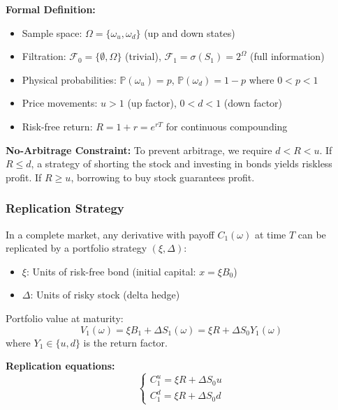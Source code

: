 \documentclass[10pt,twocolumn]{article}
\begin{document}
\textbf{Formal Definition:}
\begin{itemize}[leftmargin=*,itemsep=2pt]
    \item Sample space: $\Omega = \{\omega_u, \omega_d\}$ (up and down states)
    \item Filtration: $\mathcal{F}_0 = \{\emptyset, \Omega\}$ (trivial), $\mathcal{F}_1 = \sigma(S_1) = 2^\Omega$ (full information)
    \item Physical probabilities: $\mathbb{P}(\omega_u) = p$, $\mathbb{P}(\omega_d) = 1-p$ where $0 < p < 1$
    \item Price movements: $u > 1$ (up factor), $0 < d < 1$ (down factor)
    \item Risk-free return: $R = 1 + r = e^{rT}$ for continuous compounding
\end{itemize}

\begin{importantbox}
\textbf{No-Arbitrage Constraint:} To prevent arbitrage, we require $d < R < u$. If $R \leq d$, a strategy of shorting the stock and investing in bonds yields riskless profit. If $R \geq u$, borrowing to buy stock guarantees profit.
\end{importantbox}

\subsubsection{Replication Strategy}

In a complete market, any derivative with payoff $C_1(\omega)$ at time $T$ can be replicated by a portfolio strategy $(\xi, \Delta)$:

\begin{itemize}[itemsep=2pt]
    \item $\xi$: Units of risk-free bond (initial capital: $x = \xi B_0$)
    \item $\Delta$: Units of risky stock (delta hedge)
\end{itemize}

Portfolio value at maturity:
\begin{equation}
V_1(\omega) = \xi B_1 + \Delta S_1(\omega) = \xi R + \Delta S_0 Y_1(\omega)
\end{equation}
where $Y_1 \in \{u, d\}$ is the return factor.

\textbf{Replication equations:}
\begin{equation}
\begin{cases}
C_1^u = \xi R + \Delta S_0 u\\
C_1^d = \xi R + \Delta S_0 d
\end{cases}
\end{equation}
\end{document}
